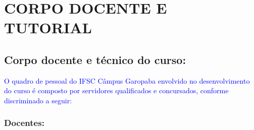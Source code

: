 \documentclass{../../modelos/latex-shared/ifsc-ppc}
\newcommand{\revisao}[1]{\textcolor{blue}{#1}}
\newcommand{\revisao}[1]{#1}
\begin{document}
\section{CORPO DOCENTE E TUTORIAL}
\subsection{Corpo docente e técnico do curso:}
\revisao{O quadro de pessoal do IFSC Câmpus Garopaba envolvido no desenvolvimento do curso é composto por servidores qualificados e concursados, conforme discriminado a seguir:}

\subsubsection{Docentes:}
\end{document}
